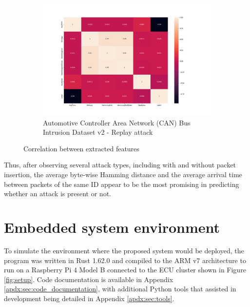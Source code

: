 \begin{figure}
    \begin{subfigure}[b]{.6\linewidth}
        \centering
        \includegraphics[width = \linewidth]{img/parts/app/feature_correlation/OpelAstra/replay.png}
        \caption{Automotive Controller Area Network (CAN) Bus Intrusion Dataset v2 - Replay attack}
        \label{subfig:fe_tue_opelastra}
    \end{subfigure}
    
    \caption{Correlation between extracted features}
    \label{fig:fe}
\end{figure}

Thus, after observing several attack types, including with and without packet insertion, the average byte-wise Hamming distance and the average arrival time between packets of the same ID appear to be the most promising in predicting whether an attack is present or not.

\section{Embedded system environment}
\label{sec:app_embedded}

To simulate the environment where the proposed system would be deployed, the program was written in Rust 1.62.0 and compiled to the ARM v7 architecture to run on a Raspberry Pi 4 Model B connected to the ECU cluster shown in Figure \ref{fig:setup}. Code documentation is available in Appendix \ref{apdx:sec:code_documentation}, with additional Python tools that assisted in development being detailed in Appendix \ref{apdx:sec:tools}.\par

